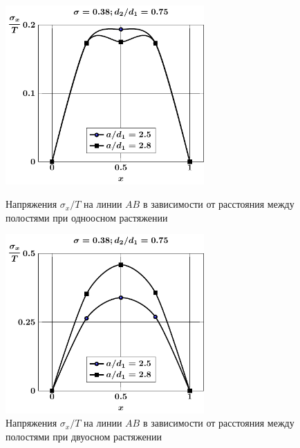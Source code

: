 \begin{russian}
\begin{figure}[h!]
\centering\footnotesize
\parbox[b]{7.5cm}{\centering\includegraphics[width=7.6cm]{periodic-cav27-a-d75-t1-sig_x.pdf}
\caption{Напряжения $\sigma_x/T$ на линии $AB$ в зависимости от расстояния между полостями при одноосном растяжении
\label{f:11:20}}}\hfil\hfil
\parbox[b]{7.5cm}{\centering\includegraphics[width=7.6cm]{periodic-cav27-a-d75-t2-sig_x.pdf}
\caption{Напряжения $\sigma_x/T$ на линии $AB$ в зависимости от расстояния между полостями при двуосном растяжении
\label{f:11:21}}}
\end{figure}


\end{russian}
